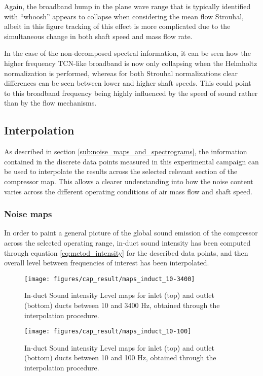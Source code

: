 Again, the broadband hump in the plane wave range that is typically identified with ``whoosh'' appears to collapse when considering the mean flow Strouhal, albeit in this figure tracking of this effect is more complicated due to the simultaneous change in both shaft speed and mass flow rate. 

In the case of the non-decomposed spectral information, it can be seen how the higher frequency TCN-like broadband is now only collapsing when the Helmholtz normalization is performed, whereas for both Strouhal normalizations clear differences can be seen between lower and higher shaft speeds. This could point to this broadband frequency being highly influenced by the speed of sound rather than by the flow mechanisms.

\subsection{Interpolation}

As described in section \ref{sub:noise_maps_and_spectrograms}, the information contained in the discrete data points measured in this experimental campaign can be used to interpolate the results across the selected relevant section of the compressor map. This allows a clearer understanding into how the noise content varies across the different operating conditions of air mass flow and shaft speed.

\subsubsection{Noise maps}

In order to paint a general picture of the global sound emission of the compressor across the selected operating range, in-duct sound intensity has been computed through equation \ref{eq:metod_intensity} for the described data points, and then overall level between frequencies of interest has been interpolated. 

\begin{figure}[tbh!]
\centering
\texttt{[image: figures/cap\_result/maps\_induct\_10-3400]}
\vspace{-2.25cm}
\caption{In-duct Sound intensity Level maps for inlet (top) and outlet (bottom) ducts between 10 and 3400 Hz, obtained through the interpolation procedure.}
\label{fig:maps_induct_10-3400}
\end{figure}

\begin{figure}[tbh!]
\centering
\texttt{[image: figures/cap\_result/maps\_induct\_10-100]}
\vspace{-2.25cm}
\caption{In-duct Sound intensity Level maps for inlet (top) and outlet (bottom) ducts between 10 and 100 Hz, obtained through the interpolation procedure.}
\label{fig:maps_induct_10-100}
\end{figure}

